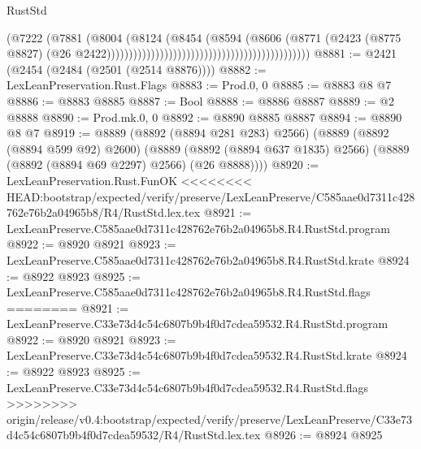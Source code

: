 \begin{lexlean}{RustStd}
\begin{coremodule}
{\begin{coremodule}
{{{{{{{{{{{{{{{{{{{{{{{{{{{{{{{{{{{{{{{                                                                            (@7222
                                                                              (@7881
                                                                                (@8004
                                                                                  (@8124
                                                                                    (@8454
                                                                                      (@8594
                                                                                        (@8606
                                                                                          (@8771
                                                                                            (@2423
                                                                                              (@8775
                                                                                                @8827)
                                                                                              (@26
                                                                                                @2422))))))))))))))))))))))))))))))))))))))))))))))
@8881 := @2421 (@2454 (@2484 (@2501 (@2514 @8876))))
@8882 := LexLeanPreservation.Rust.Flags
@8883 := Prod.{0, 0}
@8885 := @8883 @8 @7
@8886 := @8883 @8885
@8887 := Bool
@8888 := @8886 @8887
@8889 := @2 @8888
@8890 := Prod.mk.{0, 0}
@8892 := @8890 @8885 @8887
@8894 := @8890 @8 @7
@8919 := @8889
    (@8892 (@8894 @281 @283) @2566)
    (@8889
      (@8892 (@8894 @599 @92) @2600)
      (@8889 (@8892 (@8894 @637 @1835) @2566) (@8889 (@8892 (@8894 @69 @2297) @2566) (@26 @8888))))
@8920 := LexLeanPreservation.Rust.FunOK
<<<<<<<< HEAD:bootstrap/expected/verify/preserve/LexLeanPreserve/C585aae0d7311c428762e76b2a04965b8/R4/RustStd.lex.tex
@8921 := LexLeanPreserve.C585aae0d7311c428762e76b2a04965b8.R4.RustStd.program
@8922 := @8920 @8921
@8923 := LexLeanPreserve.C585aae0d7311c428762e76b2a04965b8.R4.RustStd.krate
@8924 := @8922 @8923
@8925 := LexLeanPreserve.C585aae0d7311c428762e76b2a04965b8.R4.RustStd.flags
========
@8921 := LexLeanPreserve.C33e73d4c54c6807b9b4f0d7cdea59532.R4.RustStd.program
@8922 := @8920 @8921
@8923 := LexLeanPreserve.C33e73d4c54c6807b9b4f0d7cdea59532.R4.RustStd.krate
@8924 := @8922 @8923
@8925 := LexLeanPreserve.C33e73d4c54c6807b9b4f0d7cdea59532.R4.RustStd.flags
>>>>>>>> origin/release/v0.4:bootstrap/expected/verify/preserve/LexLeanPreserve/C33e73d4c54c6807b9b4f0d7cdea59532/R4/RustStd.lex.tex
@8926 := @8924 @8925
}}}}}}}}}}}}}}}}}}}}}}}}}}}}}}}}}}}}}}}
\end{coremodule}}
\end{coremodule}
\end{lexlean}
